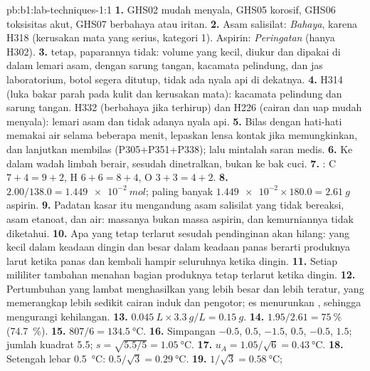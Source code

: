 \begin{solution}{pb:b1:lab-techniques-1:1}
\textbf{1.} GHS02 mudah menyala, GHS05 korosif, GHS06 toksisitas akut,
GHS07 berbahaya atau iritan.
\textbf{2.} Asam salisilat: \emph{Bahaya}, karena H318 (kerusakan mata
yang serius, kategori 1). Aspirin: \emph{Peringatan} (hanya H302).
\textbf{3.}  tetap, paparannya tidak: volume yang kecil, diukur
dan dipakai di dalam lemari asam, dengan sarung tangan, kacamata
pelindung, dan jas laboratorium, botol segera ditutup, tidak ada nyala
api di dekatnya.
\textbf{4.} H314 (luka bakar parah pada kulit dan kerusakan mata):
kacamata pelindung dan sarung tangan. H332 (berbahaya jika terhirup) dan
H226 (cairan dan uap mudah menyala): lemari asam dan tidak adanya nyala
api.
\textbf{5.} Bilas dengan hati-hati memakai air selama beberapa menit,
lepaskan lensa kontak jika memungkinkan, dan lanjutkan membilas
(P305+P351+P338); lalu mintalah saran medis.
\textbf{6.} Ke dalam wadah limbah berair, sesudah dinetralkan, bukan ke
bak cuci.
\textbf{7.} : C $7 + 4 = 9 + 2$,
H $6 + 6 = 8 + 4$, O $3 + 3 = 4 + 2$.
\textbf{8.} $2.00/138.0 = \qty{1.449e-2}{mol}$; paling banyak
$\num{1.449e-2} \times 180.0 = \qty{2.61}{g}$ aspirin.
\textbf{9.} Padatan kasar itu mengandung asam salisilat yang tidak
bereaksi, asam etanoat, dan air: massanya bukan massa aspirin, dan
kemurniannya tidak diketahui.
\textbf{10.} Apa yang tetap terlarut sesudah pendinginan akan hilang:
 yang kecil dalam keadaan dingin dan besar dalam keadaan panas
berarti produknya larut ketika panas dan kembali hampir seluruhnya
ketika dingin.
\textbf{11.} Setiap mililiter tambahan menahan bagian produknya tetap
terlarut ketika dingin.
\textbf{12.} Pertumbuhan yang lambat menghasilkan  yang lebih
besar dan lebih teratur, yang memerangkap lebih sedikit cairan induk dan
pengotor; es menurunkan , sehingga mengurangi kehilangan.
\textbf{13.} $\qty{0.045}{L} \times \qty{3.3}{g/L} = \qty{0.15}{g}$.
\textbf{14.} $1.95/2.61 = \qty{75}{\percent}$ (\qty{74.7}{\percent}).
\textbf{15.} $807/6 = \qty{134.5}{\celsius}$.
\textbf{16.} Simpangan $-0.5$, $0.5$, $-1.5$, $0.5$, $-0.5$, $1.5$;
jumlah kuadrat 5.5; $s = \sqrt{5.5/5} = \qty{1.05}{\celsius}$.
\textbf{17.} $u_A = 1.05/\sqrt6 = \qty{0.43}{\celsius}$.
\textbf{18.} Setengah lebar \qty{0.5}{\celsius}: $0.5/\sqrt3 = \qty{0.29}{\celsius}$.
\textbf{19.} $1/\sqrt3 = \qty{0.58}{\celsius}$;

\end{solution}
